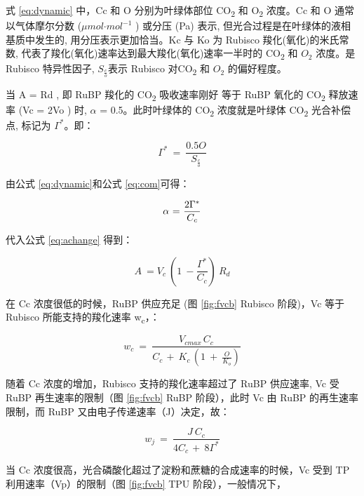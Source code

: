 \documentclass[]{krantz}
\theoremstyle{definition}
\theoremstyle{definition}
\theoremstyle{definition}
\theoremstyle{remark}
\begin{document}
式 \eqref{eq:dynamic} 中，Cc 和 O 分别为叶绿体部位 CO\textsubscript{2} 和
O\textsubscript{2} 浓度。Cc 和 O 通常以气体摩尔分数
(\(\mu mol\text{·}mol^{-1}\) ) 或分压 (Pa) 表示,
但光合过程是在叶绿体的液相基质中发生的, 用分压表示更加恰当。Kc 与 Ko 为
Rubisco 羧化(氧化)的米氏常数,
代表了羧化(氧化)速率达到最大羧化(氧化)速率一半时的 CO\textsubscript{2}
和 \(O_{2}\) 浓度。是 Rubisco 特异性因子, \(S_{\frac{c}{o}}\)表示
Rubisco 对CO\textsubscript{2} 和 \(O_{2}\) 的偏好程度。

当 A = Rd , 即 RuBP 羧化的 CO\textsubscript{2} 吸收速率刚好 等于 RuBP
氧化的 CO\textsubscript{2} 释放速率 (Vc = 2Vo ) 时, \(\alpha\) =
0.5。此时叶绿体的 CO\textsubscript{2} 浓度就是叶绿体 CO\textsubscript{2}
光合补偿点, 标记为 \(\Gamma^{*}\)。即：

\begin{equation}
\Gamma^{*}\ =\ \frac{0.5O}{S_{\frac{c}{o}}}
\label{eq:com}
\end{equation}

由公式 \eqref{eq:dynamic}和公式 \eqref{eq:com}可得：

\begin{equation}
\text{\ensuremath{\alpha}\ =\ \ensuremath{\frac{2\Gamma^{*}}{C_{c}}}}
\label{eq:combine}
\end{equation}

代入公式 \eqref{eq:achange} 得到：

\begin{equation}
A\ =V_{c}\ (1\ -\frac{\Gamma^{*}}{C_{c}})\ R_{d}
\label{eq:combine2}
\end{equation}

在 Cc 浓度很低的时候，RuBP 供应充足 (图 \ref{fig:fvcb} Rubisco 阶段)，Vc
等于 Rubisco 所能支持的羧化速率 w\textsubscript{c}，：

\begin{equation}
w_{c}\ =\ \frac{V_{cmax\ }C_{c}}{C_{c\ }+\ K_{c\ }(1\ +\ \frac{O}{K_{o}})}
\label{eq:wc}
\end{equation}

随着 Cc 浓度的增加，Rubisco 支持的羧化速率超过了 RuBP 供应速率, Vc 受
RuBP 再生速率的限制（图 \ref{fig:fvcb} RuBP 阶段），此时 Vc 由 RuBP
的再生速率限制，而 RuBP 又由电子传递速率（J）决定，故：

\begin{equation}
w_{j}\ =\ \frac{J\ C_{c}}{4C_{c\ }+\ 8\Gamma^{*}}
\end{equation}

当 Cc 浓度很高，光合磷酸化超过了淀粉和蔗糖的合成速率的时候，Vc 受到 TP
利用速率（Vp）的限制（图 \ref{fig:fvcb} TPU 阶段），一般情况下，
\end{document}
